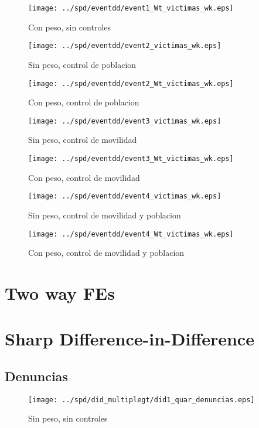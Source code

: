 \documentclass[11pt,letterpaper]{article}
\begin{document}
\begin{figure}[hbtp]
\caption{Con peso, sin controles}
\centering
\texttt{[image: ../spd/eventdd/event1\_Wt\_victimas\_wk.eps]}
\end{figure}
\begin{figure}[hbtp]
\caption{Sin peso, control de poblacion}
\centering
\texttt{[image: ../spd/eventdd/event2\_victimas\_wk.eps]}
\end{figure}

\begin{figure}[hbtp]
\caption{Con peso, control de poblacion}
\centering
\texttt{[image: ../spd/eventdd/event2\_Wt\_victimas\_wk.eps]}
\end{figure}
\begin{figure}[hbtp]
\caption{Sin peso, control de movilidad}
\centering
\texttt{[image: ../spd/eventdd/event3\_victimas\_wk.eps]}
\end{figure}

\begin{figure}[hbtp]
\caption{Con peso, control de movilidad}
\centering
\texttt{[image: ../spd/eventdd/event3\_Wt\_victimas\_wk.eps]}
\end{figure}
\begin{figure}[hbtp]
\caption{Sin peso, control de movilidad y poblacion}
\centering
\texttt{[image: ../spd/eventdd/event4\_victimas\_wk.eps]}
\end{figure}

\begin{figure}[hbtp]
\caption{Con peso, control de movilidad y poblacion}
\centering
\texttt{[image: ../spd/eventdd/event4\_Wt\_victimas\_wk.eps]}
\end{figure}

\section{Two way FEs}

\section{Sharp Difference-in-Difference}
	\subsection{Denuncias}
\begin{figure}[hbtp]
\caption{Sin peso, sin controles}
\centering
\texttt{[image: ../spd/did\_multiplegt/did1\_quar\_denuncias.eps]}
\end{figure}
\end{document}
